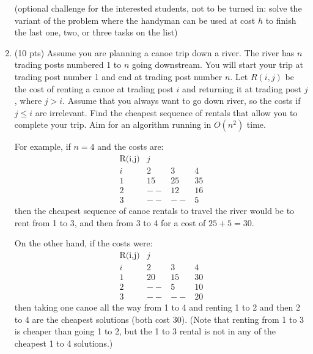 \documentclass[11pt]{article}
\begin{document}
\begin{enumerate}
(optional challenge for the interested students, not to be turned in: solve the variant of the problem 
where the handyman can be used at cost $h$ to finish the last one, two, or three tasks on the list) 
\newpage

 \item (10 pts) Assume you are planning a canoe trip down a river.
The river has $n$ trading posts numbered 1 to $n$ going downstream.
You will start your trip at trading post number 1 and end at trading 
post number $n$.  
Let $R(i,j)$ be the cost of renting a canoe at trading post
$i$ and returning it at trading post $j$, where $j> i$.
Assume that you always want to go down river, so the costs if $j\leq i$ 
are irrelevant.  Find the cheapest sequence of rentals that 
allow you to complete your trip.
Aim for an algorithm running in $O(n^2)$ time.

For example, if $n=4$ and the costs are:
\[
\begin{array}{lccc} 
\mbox{R(i,j)} &  {j}  \\ 
{i} &   2 &   3 &   4 \\ \hline
1   &  15 &  25 &  35 \\
2   &  -- &  12 &  16 \\
3   &  -- & -- & 5
\end{array}
\]
then the cheapest sequence of canoe rentals to travel the river
would be to rent from 1 to 3, and then from 3 to 4 for a cost of $25+5=30$.

On the other hand, if the costs were:
\[
\begin{array}{lccc} 
\mbox{R(i,j)} & {j}  \\
{i} &   2 &   3 &   4 \\ \hline
1   &  20 &  15 &  30 \\
2   &  -- &  5 &  10 \\
3   &  -- & -- & 20
\end{array}
\]
then taking one canoe all the way from 1 to 4 and 
renting 1 to 2 and then 2 to 4 are the cheapest solutions (both cost 30). 
(Note that renting from 1 to 3 is cheaper than going 1 to 2, but the 
1 to 3 rental is not in any of the cheapest 1 to 4 solutions.)


\end{enumerate}
\end{document}
